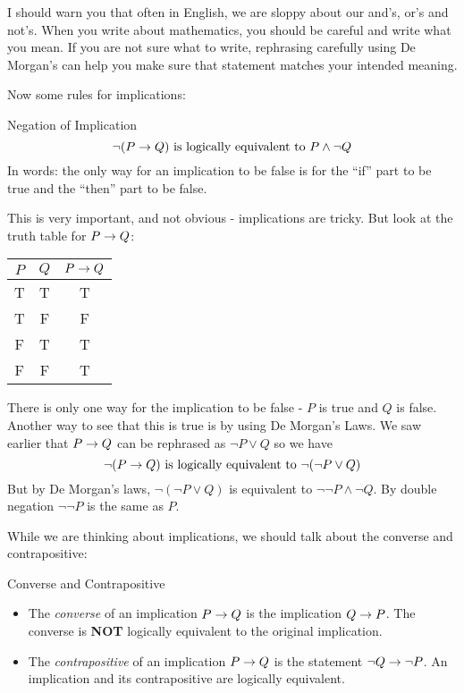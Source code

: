 \documentclass[12pt]{article}
\begin{document}
I should warn you that often in English, we are sloppy about our and's, or's and not's.  When you write about mathematics, you should be careful and write what you mean.  If you are not sure what to write, rephrasing carefully using De Morgan's can help you make sure that statement matches your intended meaning.

Now some rules for implications:

\begin{defbox}{Negation of Implication}
  \[\neg(P \rightarrow Q) \mbox{ is logically equivalent to } P \wedge \neg Q\]
  In words: the only way for an implication to be false is for the ``if'' part to be true and the ``then'' part to be false.
\end{defbox}

This is very important, and not obvious - implications are tricky.  But look at the truth table for $P \rightarrow Q$:

\begin{tabular}{c|c|c}
 $P$ & $Q$ & $P\rightarrow Q$ \\ \hline
 T & T & T\\
 T & F & F\\
 F & T & T\\
 F & F & T
\end{tabular}

There is only one way for the implication to be false - $P$ is true and $Q$ is false.  Another way to see that this is true is by using De Morgan's Laws.  We saw earlier that $P \rightarrow Q$ can be rephrased as $\neg P \vee Q$ so we have
\[\neg (P \rightarrow Q) \mbox{ is logically equivalent to } \neg( \neg P \vee Q)\]
But by De Morgan's laws, $\neg( \neg P \vee Q)$ is equivalent to $\neg \neg P \wedge \neg Q$.  By double negation $\neg \neg P$ is the same as $P$.

While we are thinking about implications, we should talk about the converse and contrapositive:

\begin{defbox}{Converse and Contrapositive}
  \begin{itemize}
    \item The {\em converse} of an implication $P \rightarrow Q$ is the implication $Q \rightarrow P$.  The converse is {\bf NOT} logically equivalent to the original implication.
    \item The {\em contrapositive} of an implication $P \rightarrow Q$ is the statement $\neg Q \rightarrow \neg P$.  An implication and its contrapositive are logically equivalent.
  \end{itemize}

\end{defbox}
\end{document}
